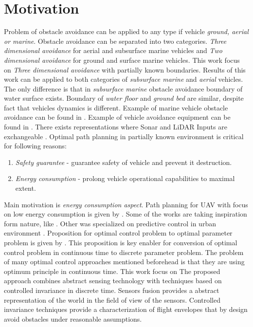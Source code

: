 \newpage
\section{Motivation}\noindent
Problem of obstacle avoidance can be applied to any type if vehicle \textit{ground, aerial or marine}. Obstacle avoidance can be separated into two categories. \textit{Three dimensional avoidance} for aerial and subsurface marine vehicles  and \textit{Two dimensional avoidance} for ground and surface marine vehicles. This work focus on \textit{Three dimensional avoidance} with partially known boundaries. Results of this work can be applied to both categories of \textit{subsurface marine} and \textit{aerial} vehicles. The only difference is that in \textit{subsurface marine} obstacle avoidance boundary of water surface exists. Boundary of \textit{water floor} and \textit{ground bed} are similar, despite fact that vehicles dynamics is different. Example of marine vehicle obstacle avoidance can be found in \cite{benjamin2006navigation}. Example of vehicle avoidance equipment can be found in \cite{chey1986vehicle}. There exists representations where Sonar and LiDAR Inputs are exchangeable \cite{fiorini1998motion}. 
\noindent
Optimal path planning in partially known environment is critical for following reasons:
\begin{enumerate}
    \item \textit{Safety guarantee} - guarantee safety of vehicle and prevent it destruction.
    \item \textit{Energy consumption} - prolong vehicle operational capabilities to maximal extent.
\end{enumerate}
Main motivation is  \textit{energy consumption aspect}. Path planning for UAV with focus on low energy consumption is given by \cite{bortoff2000path}. Some of the works are taking inspiration form  nature, like \cite{ma2007improved}. Other was specialized on predictive control in urban environment \cite{singh2001trajectory}. Proposition for optimal control problem to optimal parameter problem is given by \cite{hull1997conversion}. This proposition is key enabler for conversion of optimal control problem in continuous time to discrete parameter problem. 
\noindent
The problem of many optimal control approaches mentioned beforehead is that they are using optimum principle in continuous time. This work focus on The proposed approach combines abstract sensing technology with techniques based on controlled invariance in discrete time. Sensors fusion provides a abstract representation of the world in the field of view of the sensors. Controlled invariance techniques provide a characterization of flight envelopes that by design avoid obstacles under reasonable assumptions. 

